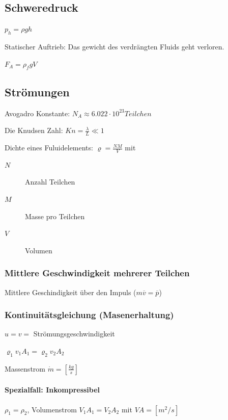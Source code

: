 \documentclass[a4paper]{scrartcl}
\begin{document}
\subsection{Schweredruck}


$p_h = \rho g h$


Statischer Auftrieb: Das gewicht des verdrängten Fluids geht verloren.

$F_A = \rho_f g V$

\subsection{Strömungen}

Avogadro Konstante: $N_A \approx 6.022 \cdot 10^23 Teilchen$

Die Knudsen Zahl: $Kn = \frac{\lambda}{L} \ll 1$

Dichte eines Fuluidelements: $\varrho = \frac{NM}{V}$ mit
\begin{description}
	\item[$N$] Anzahl Teilchen
	\item[$M$] Masse pro Teilchen 
	\item[$V$] Volumen
\end{description}

\subsubsection{Mittlere Geschwindigkeit mehrerer Teilchen}

Mittlere Geschindigkeit über den Impuls ($m\overline{v} = \overline{p}$)


\subsubsection{Kontinuitätsgleichung (Masenerhaltung)}


$u = v = $ Strömungsgeschwindigkeit 

$\varrho_1 v_1 A_1 = \varrho_2 v_2 A_2$

Massenstrom $\dot{m} = \left[ \frac{kg}{s} \right]$

\paragraph{Spezialfall: Inkompressibel} $\rho_1 = \rho_2$, Volumenstrom $V_1 A_1 = V_2 A_2$ mit $VA = \left[ m^2/s \right]$
\end{document}
